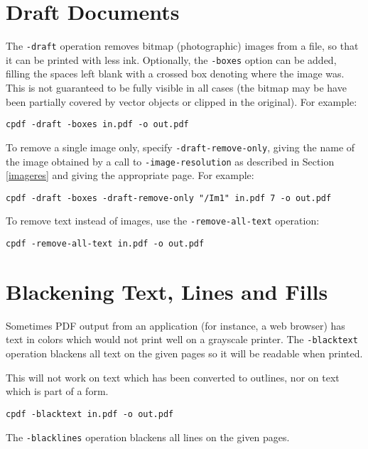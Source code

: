 \documentclass{book}
\begin{document}
  \section{Draft Documents}
\label{draft}
    The \texttt{-draft} operation removes bitmap (photographic) images from a
file, so that it can be printed with less ink. Optionally, the
\texttt{-boxes} option can be added, filling the spaces left blank with a
crossed box denoting where the image was. This is not guaranteed to be fully
visible in all cases (the bitmap may be have been partially covered by vector
objects or clipped in the original). For example:
  \begin{framed}
    \small\verb!cpdf -draft -boxes in.pdf -o out.pdf!
  \end{framed}

\noindent To remove a single image only, specify \texttt{-draft-remove-only}, giving the name of the image obtained by a call to \texttt{-image-resolution} as described in Section \ref{imageres} and giving the appropriate page. For example:

  \begin{framed}
    \small\verb!cpdf -draft -boxes -draft-remove-only "/Im1" in.pdf 7 -o out.pdf!
  \end{framed}

\noindent To remove text instead of images, use the \texttt{-remove-all-text} operation:

  \begin{framed}
    \small\verb!cpdf -remove-all-text in.pdf -o out.pdf!
  \end{framed}

  \section{Blackening Text, Lines and Fills}
  Sometimes PDF output from an application (for instance, a web browser) has
text in colors which would not print well on a grayscale printer. The
\texttt{-blacktext} operation blackens all text on the given pages so it will be readable
when printed.

  This will not work on text which has been converted to outlines, nor on text
which is part of a form.
  \begin{framed}
    \small\verb!cpdf -blacktext in.pdf -o out.pdf!
  \end{framed}


\noindent The \texttt{-blacklines} operation blackens all lines on the given pages.
\end{document}
